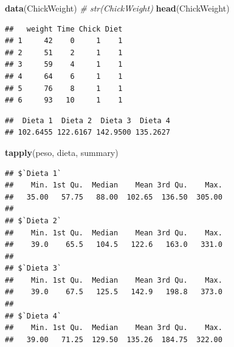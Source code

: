 \documentclass[
]{book}
\newenvironment{Shaded}{\begin{snugshade}}{\end{snugshade}}
\newcommand{\CommentTok}[1]{\textcolor[rgb]{0.56,0.35,0.01}{\textit{#1}}}
\newcommand{\KeywordTok}[1]{\textcolor[rgb]{0.13,0.29,0.53}{\textbf{#1}}}
\newcommand{\NormalTok}[1]{#1}
\newcommand{\OperatorTok}[1]{\textcolor[rgb]{0.81,0.36,0.00}{\textbf{#1}}}
\newcommand{\StringTok}[1]{\textcolor[rgb]{0.31,0.60,0.02}{#1}}
\begin{document}
\begin{Shaded}
\begin{Highlighting}[]
\KeywordTok{data}\NormalTok{(ChickWeight)}
\CommentTok{# str(ChickWeight)}
\KeywordTok{head}\NormalTok{(ChickWeight)}
\end{Highlighting}
\end{Shaded}

\begin{verbatim}
##   weight Time Chick Diet
## 1     42    0     1    1
## 2     51    2     1    1
## 3     59    4     1    1
## 4     64    6     1    1
## 5     76    8     1    1
## 6     93   10     1    1
\end{verbatim}

\begin{Shaded}
\end{Shaded}

\begin{verbatim}
##  Dieta 1  Dieta 2  Dieta 3  Dieta 4 
## 102.6455 122.6167 142.9500 135.2627
\end{verbatim}

\begin{Shaded}
\begin{Highlighting}[]
\KeywordTok{tapply}\NormalTok{(peso, dieta, summary)}
\end{Highlighting}
\end{Shaded}

\begin{verbatim}
## $`Dieta 1`
##    Min. 1st Qu.  Median    Mean 3rd Qu.    Max. 
##   35.00   57.75   88.00  102.65  136.50  305.00 
## 
## $`Dieta 2`
##    Min. 1st Qu.  Median    Mean 3rd Qu.    Max. 
##    39.0    65.5   104.5   122.6   163.0   331.0 
## 
## $`Dieta 3`
##    Min. 1st Qu.  Median    Mean 3rd Qu.    Max. 
##    39.0    67.5   125.5   142.9   198.8   373.0 
## 
## $`Dieta 4`
##    Min. 1st Qu.  Median    Mean 3rd Qu.    Max. 
##   39.00   71.25  129.50  135.26  184.75  322.00
\end{verbatim}
\end{document}
